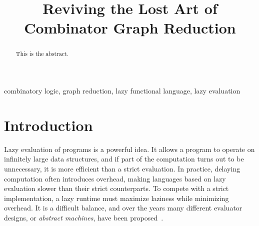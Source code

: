 \documentclass[conference]{IEEEtran}
\begin{document}
\title{Reviving the Lost Art of Combinator Graph Reduction}

\author{
}

\maketitle

\begin{abstract}
    This is the abstract.
\end{abstract}

\begin{IEEEkeywords}
    combinatory logic, graph reduction, lazy functional language, lazy evaluation
\end{IEEEkeywords}

\section{Introduction}
Lazy evaluation of programs is a powerful idea.
It allows a program to operate on infinitely large data structures, and if part of the computation turns out to be unnecessary, it is more efficient than a strict evaluation.
In practice, delaying computation often introduces overhead, making languages based on lazy evaluation slower than their strict counterparts.
To compete with a strict implementation, a lazy runtime must maximize laziness while minimizing overhead.
It is a difficult balance, and over the years many different evaluator designs, or \textit{abstract machines}, have been proposed~\cite{turner_new_1979,kieburtz_g-machine_1985,fairbairn_tim_1987,burn_spineless_1988,koopman_fresh_1989,jones_implementing_nodate}.
\end{document}
